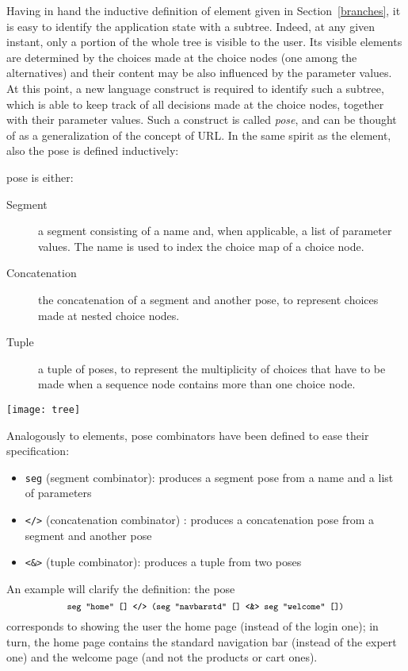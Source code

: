 \documentclass[12pt]{article} %
\newcommand{\myverb}[1]{\texttt{\footnotesize #1}}
\newcounter{dccounter}
\newenvironment{dce}[3]
	{\refstepcounter{dccounter}\begin{tcolorbox}[colback=red!5!white,colframe=red!75!black,fonttitle=\bfseries,
size=small,righthand width=3cm,sidebyside,sidebyside align=center seam,lower separated=false,title=Design choice \thedccounter: \emph{#1}\label{#2}]}
	{\tcblower
     \texttt{[image: tree]}%
    \end{tcolorbox}}
\begin{document}
Having in hand the inductive definition of element given in Section~\ref{branches}, it is easy to identify the application state with a subtree. Indeed, at any given instant, only a portion of the whole tree is visible to the user. Its visible elements are determined by the choices made at the choice nodes (one among the alternatives) and their content may be also influenced by the parameter values. 
At this point, a new language construct is required to identify such a subtree, which is able to keep track of all decisions made at the choice nodes, together with their parameter values. Such a construct is called \emph{pose}, and can be thought of as a generalization of the concept of URL. In the same spirit as the element, also the pose is defined inductively:
\begin{dce}{Pose}{pose}
A pose is either:
\begin{description}
\item[Segment] a segment consisting of a name and, when applicable, a list of parameter values. The name is used to index the choice map of a choice node.
\item[Concatenation] the concatenation of a segment and another pose, to represent choices made at nested choice nodes.
\item[Tuple] a tuple of poses, to represent the multiplicity of choices that have to be made when a sequence node contains more than one choice node.
\end{description}
\end{dce}
Analogously to elements, pose combinators have been defined to ease their specification:
\begin{itemize}
\item \myverb{seg} (segment combinator): produces a segment pose from a name and a list of parameters
\item \myverb{</>} (concatenation combinator) : produces a concatenation pose from a segment and another pose
\item \myverb{<\&>} (tuple combinator): produces a tuple from two poses
\end{itemize}

An example will clarify the definition: the pose 
\[
\myverb{seg "home" [] </> (seg "navbarstd" [] <\&> seg "welcome" [])}
\]
corresponds to showing the user the home page (instead of the login one); in turn, the home page contains the standard navigation bar (instead of the expert one) and the welcome page (and not the products or cart ones).
\end{document}
